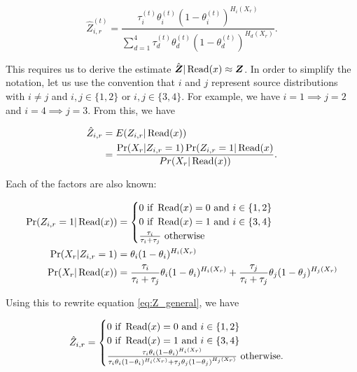   \begin{equation}
    \hat{Z}_{i, r}^{(t)} =
        \frac{\tau_i^{(t)} \theta_i^{(t)} (1 - \theta_i^{(t)})^{H_i(X_r)}}
        {\sum_{d = 1}^{4}
         \tau_d^{(t)} \theta_d^{(t)} (1 - \theta_d^{(t)})^{H_d(X_r)}} .
  \end{equation}

  This requires us to derive the estimate $\hat{\bm{Z}} | \operatorname*{\operatorname{Read}}(x) \approx
  \bm{Z}$. In order to simplify the notation, let us use the convention that $i$
  and $j$ represent source distributions with $i \ne j$ and $i, j \in \{1, 2\}$ or
  $i, j \in \{3, 4\}$. For example, we have $i = 1 \implies j = 2$ and $i = 4
  \implies j = 3$. From this, we have

  \begin{align}
    \hat{Z}_{i, r}
      &= E(Z_{i, r} | \operatorname*{\operatorname{Read}}(x)) \\
      \label{eq:Z_general}
      &= \frac
        {\Pr(X_r | Z_{i, r} = 1) \Pr(Z_{i, r} = 1 | \operatorname*{\operatorname{Read}}(x)}
        {Pr(X_r | \operatorname*{\operatorname{Read}}(x))} .
  \end{align}

  Each of the factors are also known:

  \begin{align}
    \Pr(Z_{i, r} = 1 | \operatorname*{\operatorname{Read}}(x)) &=
      \begin{cases}
        0 \mbox{ if } \operatorname*{\operatorname{Read}}(x) = 0 \mbox{ and } i \in \{1, 2\} \\
        0 \mbox{ if } \operatorname*{\operatorname{Read}}(x) = 1 \mbox{ and } i \in \{3, 4\} \\
        \frac{\tau_i}{\tau_i + \tau_j} \mbox{ otherwise}
      \end{cases} \\
    \Pr(X_r | Z_{i, r} = 1) &= \theta_i (1 - \theta_i)^{H_i(X_r)} \\
    \Pr(X_r | \operatorname*{\operatorname{Read}}(x)) &=
      \frac{\tau_i}{\tau_i + \tau_j} \theta_i (1 - \theta_i)^{H_i(X_r)} +
      \frac{\tau_j}{\tau_i + \tau_j} \theta_j (1 - \theta_j)^{H_j(X_r)}
  \end{align}

  Using this to rewrite equation \ref{eq:Z_general}, we have

  \begin{equation}
    \hat{Z}_{i, r} =
      \begin{cases}
        0 \mbox{ if } \operatorname*{\operatorname{Read}}(x) = 0 \mbox{ and } i \in \{1, 2\} \\
        0 \mbox{ if } \operatorname*{\operatorname{Read}}(x) = 1 \mbox{ and } i \in \{3, 4\} \\
        \frac
          {\tau_i \theta_i (1 - \theta_i)^{H_i(X_r)}}
          {\tau_i \theta_i (1 - \theta_i)^{H_i(X_r)} +
           \tau_j \theta_j (1 - \theta_j)^{H_j(X_r)}
          } \mbox{ otherwise.}
      \end{cases}
  \end{equation}


